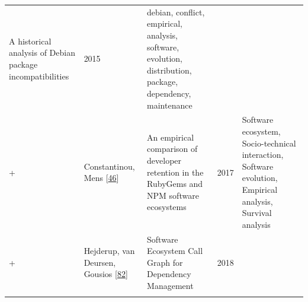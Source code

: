 \documentclass[]{book}
\begin{document}
\begin{longtable}[]{@{}lllll@{}}
\begin{minipage}[t]{0.34\columnwidth}
A historical analysis of Debian package incompatibilities\strut
\end{minipage} & \begin{minipage}[t]{0.02\columnwidth}\raggedright\strut
2015\strut
\end{minipage} & \begin{minipage}[t]{0.39\columnwidth}\raggedright\strut
debian, conflict, empirical, analysis, software, evolution,
distribution, package, dependency, maintenance\strut
\end{minipage}\tabularnewline
\begin{minipage}[t]{0.01\columnwidth}\raggedright\strut
+\strut
\end{minipage} & \begin{minipage}[t]{0.09\columnwidth}\raggedright\strut
Constantinou, Mens
{[}\protect\hyperlink{ref-Constantinou2017}{46}{]}\strut
\end{minipage} & \begin{minipage}[t]{0.34\columnwidth}\raggedright\strut
An empirical comparison of developer retention in the RubyGems and NPM
software ecosystems\strut
\end{minipage} & \begin{minipage}[t]{0.02\columnwidth}\raggedright\strut
2017\strut
\end{minipage} & \begin{minipage}[t]{0.39\columnwidth}\raggedright\strut
Software ecosystem, Socio-technical interaction, Software evolution,
Empirical analysis, Survival analysis\strut
\end{minipage}\tabularnewline
\begin{minipage}[t]{0.01\columnwidth}\raggedright\strut
+\strut
\end{minipage} & \begin{minipage}[t]{0.09\columnwidth}\raggedright\strut
Hejderup, van Deursen, Gousios
{[}\protect\hyperlink{ref-Hejderup2018}{82}{]}\strut
\end{minipage} & \begin{minipage}[t]{0.34\columnwidth}\raggedright\strut
Software Ecosystem Call Graph for Dependency Management\strut
\end{minipage} & \begin{minipage}[t]{0.02\columnwidth}\raggedright\strut
2018\strut
\end{minipage} & \begin{minipage}[t]{0.39\columnwidth}\raggedright\strut
\strut
\end{minipage}\tabularnewline
\begin{minipage}[t]{0.01\columnwidth}\raggedright\strut

\end{minipage}
\end{longtable}
\end{document}
